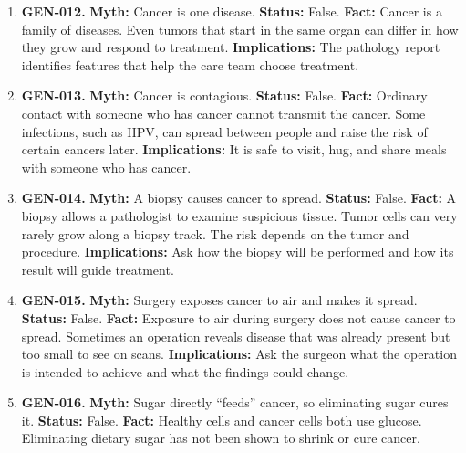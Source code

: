 \documentclass[11pt,oneside]{book}
\begin{document}
\begin{enumerate}[leftmargin=0pt,labelwidth=0pt,labelsep=0pt,itemindent=0pt]
\item[] \textbf{GEN-012.} \textbf{Myth:} Cancer is one disease.\newline
\textbf{Status:} False.\newline
\textbf{Fact:} Cancer is a family of diseases. Even tumors that start in the same organ can differ in how they grow and respond to treatment. \cite{ref16}\newline
\textbf{Implications:} The pathology report identifies features that help the care team choose treatment.
\item[] \textbf{GEN-013.} \textbf{Myth:} Cancer is contagious.\newline
\textbf{Status:} False.\newline
\textbf{Fact:} Ordinary contact with someone who has cancer cannot transmit the cancer. Some infections, such as HPV, can spread between people and raise the risk of certain cancers later. \cite{ref16}\newline
\textbf{Implications:} It is safe to visit, hug, and share meals with someone who has cancer.
\item[] \textbf{GEN-014.} \textbf{Myth:} A biopsy causes cancer to spread.\newline
\textbf{Status:} False.\newline
\textbf{Fact:} A biopsy allows a pathologist to examine suspicious tissue. Tumor cells can very rarely grow along a biopsy track. The risk depends on the tumor and procedure. \cite{ref16}\newline
\textbf{Implications:} Ask how the biopsy will be performed and how its result will guide treatment.
\item[] \textbf{GEN-015.} \textbf{Myth:} Surgery exposes cancer to air and makes it spread.\newline
\textbf{Status:} False.\newline
\textbf{Fact:} Exposure to air during surgery does not cause cancer to spread. Sometimes an operation reveals disease that was already present but too small to see on scans. \cite{ref16}\newline
\textbf{Implications:} Ask the surgeon what the operation is intended to achieve and what the findings could change.
\item[] \textbf{GEN-016.} \textbf{Myth:} Sugar directly ``feeds'' cancer, so eliminating sugar cures it.\newline
\textbf{Status:} False.\newline
\textbf{Fact:} Healthy cells and cancer cells both use glucose. Eliminating dietary sugar has not been shown to shrink or cure cancer. \cite{ref16}\newline

\end{enumerate}
\end{document}
